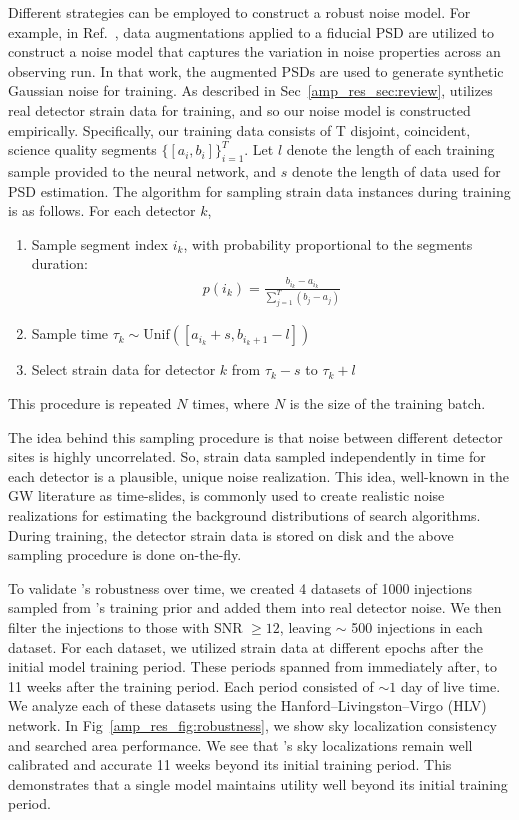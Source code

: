 \begin{refsection}
Different strategies can be employed to construct a robust noise model. 
For example, in Ref.~\cite{Wildberger_2023}, data augmentations applied to a fiducial PSD are utilized to construct a noise model that captures the variation in noise properties across an observing run. 
In that work, the augmented PSDs are used to generate synthetic Gaussian noise for training. 
As described in Sec~\ref{amp_res_sec:review}, \amplfi utilizes real detector strain data for training, and so our noise model is constructed empirically. 
Specifically, our training data consists of T disjoint, coincident, science quality segments $\{[a_i, b_i]\}_{i=1}^{T}$. 
Let $l$ denote the length of each training sample provided to the neural network, and $s$ denote the length of data used for PSD estimation. 
The algorithm for sampling strain data instances during training is as follows. 
For each detector $k$,
\begin{enumerate}
    \item Sample segment index $i_k$, with probability proportional to the segments duration:
    \begin{align*}
       p(i_k) = \frac{b_{i_k} - a_{i_k}}{\sum_{j=1}^T{(b_j - a_j)}}
    \end{align*}
    
    \item Sample time $\tau_k \sim \mathrm{Unif}([a_{i_k} + s,b_{i_k + 1} - l])$
    \item Select strain data for detector $k$ from $\tau_k - s$ to $\tau_k + l$ 
\end{enumerate}
This procedure is repeated $N$ times, where $N$ is the size of the training batch. 

The idea behind this sampling procedure is that noise between different detector sites is highly uncorrelated. 
So, strain data sampled independently in time for each detector is a plausible, unique noise realization. 
This idea, well-known in the GW literature as time-slides, is commonly used to create realistic noise realizations for estimating the background distributions of search algorithms. 
During training, the detector strain data is stored on disk and the above sampling procedure is done on-the-fly.

To validate \amplfi's robustness over time, we created 4 datasets of 1000 injections sampled from \amplfi's training prior and added them into real detector noise. 
We then filter the injections to those with SNR $\geq 12$, leaving $\sim$ 500 injections in each dataset.
For each dataset, we utilized strain data at different epochs after the initial model training period. 
These periods spanned from immediately after, to 11 weeks after the training period. 
Each period consisted of $\sim 1$ day of live time. 
We analyze each of these datasets using the Hanford--Livingston--Virgo (HLV) \amplfi network. 
In Fig~\ref{amp_res_fig:robustness}, we show sky localization consistency and searched area performance. 
We see that \amplfi's sky localizations remain well calibrated and accurate 11 weeks beyond its initial training period. 
This demonstrates that a single \amplfi model maintains utility well beyond its initial training period. 


\end{refsection}
